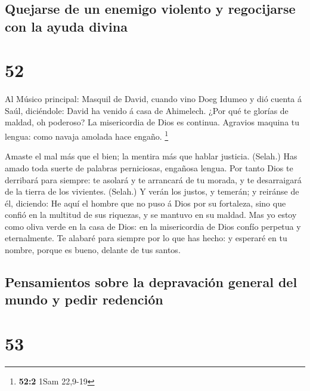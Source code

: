 \hypertarget{quejarse-de-un-enemigo-violento-y-regocijarse-con-la-ayuda-divina}{%
\subsection{Quejarse de un enemigo violento y regocijarse con la ayuda
divina}\label{quejarse-de-un-enemigo-violento-y-regocijarse-con-la-ayuda-divina}}

\hypertarget{section-51}{%
\section{52}\label{section-51}}

 Al Músico principal: Masquil de David, cuando vino Doeg
Idumeo y dió cuenta á Saúl, diciéndole: David ha venido á casa de
Ahimelech. ¿Por qué te glorías de maldad, oh poderoso? La misericordia
de Dios es continua.  Agravios maquina tu lengua: como
navaja amolada hace engaño. \footnote{\textbf{52:2} 1Sam 22,9-19}

 Amaste el mal más que el bien; la mentira más que hablar
justicia. (Selah.)  Has amado toda suerte de palabras
perniciosas, engañosa lengua.  Por tanto Dios te derribará
para siempre: te asolará y te arrancará de tu morada, y te desarraigará
de la tierra de los vivientes. (Selah.)  Y verán los justos,
y temerán; y reiránse de él, diciendo:  He aquí el hombre
que no puso á Dios por su fortaleza, sino que confió en la multitud de
sus riquezas, y se mantuvo en su maldad.  Mas yo estoy como
oliva verde en la casa de Dios: en la misericordia de Dios confío
perpetua y eternalmente.  Te alabaré para siempre por lo que
has hecho: y esperaré en tu nombre, porque es bueno, delante de tus
santos.

\hypertarget{pensamientos-sobre-la-depravaciuxf3n-general-del-mundo-y-pedir-redenciuxf3n-1}{%
\subsection{Pensamientos sobre la depravación general del mundo y pedir
redención}\label{pensamientos-sobre-la-depravaciuxf3n-general-del-mundo-y-pedir-redenciuxf3n-1}}

\hypertarget{section-52}{%
\section{53}\label{section-52}}

